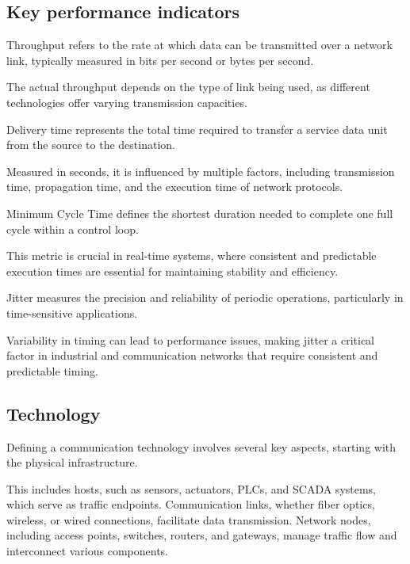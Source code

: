 \subsection{Key performance indicators}
\begin{definition}
    Throughput refers to the rate at which data can be transmitted over a network link, typically measured in bits per second or bytes per second.
\end{definition}
\noindent The actual throughput depends on the type of link being used, as different technologies offer varying transmission capacities.
\begin{definition}
    Delivery time represents the total time required to transfer a service data unit from the source to the destination.
\end{definition}
\noindent Measured in seconds, it is influenced by multiple factors, including transmission time, propagation time, and the execution time of network protocols.
\begin{definition}
    Minimum Cycle Time defines the shortest duration needed to complete one full cycle within a control loop. 
\end{definition}
\noindent This metric is crucial in real-time systems, where consistent and predictable execution times are essential for maintaining stability and efficiency.
\begin{definition}
    Jitter measures the precision and reliability of periodic operations, particularly in time-sensitive applications.
\end{definition}
\noindent Variability in timing can lead to performance issues, making jitter a critical factor in industrial and communication networks that require consistent and predictable timing.

\subsection{Technology}
Defining a communication technology involves several key aspects, starting with the physical infrastructure.

This includes hosts, such as sensors, actuators, PLCs, and SCADA systems, which serve as traffic endpoints. 
Communication links, whether fiber optics, wireless, or wired connections, facilitate data transmission.
Network nodes, including access points, switches, routers, and gateways, manage traffic flow and interconnect various components.

